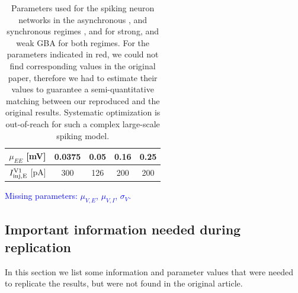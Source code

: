 \begin{table}[!ht]
\begin{tabular}{c|c|c|c|c|}
\multicolumn{1}{|c|}{$\mu_{EE}$ {[}mV{]}}                & 0.0375              & 0.05                 & 0.16               & 0.25                 \\ \hline
\multicolumn{1}{|c|}{$I_{\rm inj, E}^{\rm V1}$ {[}pA{]}} & 300                 & 126                  & 200                & 200                  \\ \hline
\end{tabular}
\caption{Parameters used for the spiking neuron networks in the asynchronous , and synchronous regimes , and for strong, and weak GBA for both regimes. For the parameters indicated in red, we could not find corresponding values in the original paper, therefore we had to estimate their values to guarantee a semi-quantitative matching between our reproduced and the original results. Systematic optimization is out-of-reach for such a complex large-scale spiking model.} \textcolor{blue}{Missing parameters: $\mu_{V,E}$, $\mu_{V,I}$, $\sigma_V$.}\label{tab:par_spike}
\end{table}

\subsection{Important information needed during replication}
\label{important_info}

In this section we list some information and parameter values that were needed to replicate the results, but were not found in the original article.

